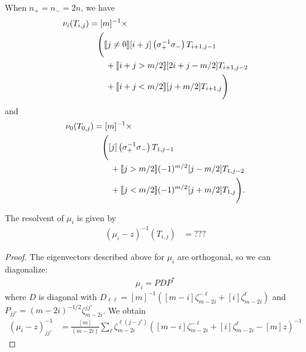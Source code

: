\documentclass[12pt]{article}
\begin{document}






\begin{lem} 
\label{lem:nu0}
When $n_+ = n_- = 2n$, we have
\begin{align*}
\nu_i(T_{i,j})
& = [m]^{-1} \times\\
& \quad \Bigg(
[\![ j \neq 0 ]\!] [i+j] \left(\sigma_+^{-1} \sigma_-\right) T_{i+1, j-1} \\
& \qquad +
[\![ i+j > m/2 ]\!] [2i + j - m/2] T_{i+1,j-2} \\
& \qquad +
[\![ i+j < m/2 ]\!] [j+ m/2 ] T_{i+1,j} \Bigg)
\end{align*}
and
\begin{align*}
\nu_0(T_{0,j})
& = [m]^{-1} \times \\
& \quad \Bigg(
 [j] \left(\sigma_+^{-1} \sigma_-\right) T_{1, j-1} \\
& \qquad + [\![ j > m/2 ]\!] (-1)^{m/2} [j- m/2] T_{1,j - 2} \\
& \qquad + [\![ j < m/2 ]\!] (-1)^{m/2} [j+ m/2] T_{1,j} \Bigg).
\end{align*}
\end{lem}


\begin{lem}
The resolvent of $\mu_i$ is given by
\begin{align*}
(\mu_i - z)^{-1}(T_{i,j}) & = ???
\end{align*}
\end{lem}
\begin{proof}
The eigenvectors described above for $\mu_i$ are orthogonal, so we can diagonalize:
\begin{align*}
\mu_i = P D P^*
\end{align*}
where $D$ is diagonal with 
$D_{\ell\ell} = [m]^{-1} \left([m-i] \zeta_{m-2i}^{-\ell} + [i] \zeta_{m-2i}^\ell\right)$ and
$P_{jj'} = (m-2i)^{-1/2} \zeta_{m-2i}^{jj'}$.
We obtain
\begin{align*}
(\mu_i - z)^{-1}_{jj'} & = \frac{ [m]}{(m-2i)} \sum_{\ell} \zeta_{m-2i}^{\ell(j-j')}  \left([m-i] \zeta_{m-2i}^{-\ell} + [i] \zeta_{m-2i}^\ell - [m] z\right)^{-1}
\end{align*}

\end{proof}
\end{document}

